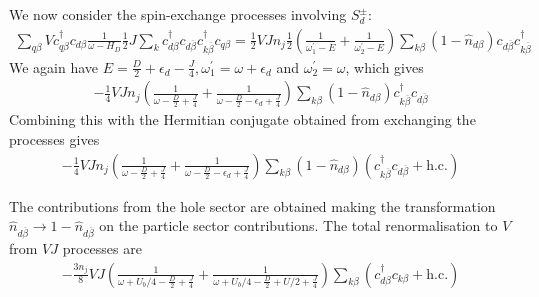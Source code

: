 \documentclass[reprint,superscriptaddress,floatfix]{revtex4-2}
\begin{document}
\begin{widetext}
We now consider the spin-exchange processes involving \(S_d^\pm\):
\begin{equation}\begin{aligned}
	\sum_{q\beta} Vc^\dagger_{q\beta} c_{d\beta} \frac{1}{\omega - H_D}\frac{1}{2}J \sum_{k} c^\dagger_{d\beta}c_{d\overline\beta} c^\dagger_{k\overline\beta}c_{q\beta} = \frac{1}{2}V J n_j \frac{1}{2}\left(\frac{1}{\omega^\prime_1 - E} + \frac{1}{\omega^\prime_2 - E}\right) \sum_{k\beta} \left(1 - \hat n_{d\beta}\right) c_{d\overline\beta}c^\dagger_{k\overline\beta}
\end{aligned}\end{equation}
We again have \(E = \frac{D}{2} + \epsilon_d - \frac{J}{4},\omega_1^\prime = \omega + \epsilon_d\) and \(\omega_2^\prime = \omega\), which gives
\begin{equation}\begin{aligned}
	-\frac{1}{4}V J n_j \left(\frac{1}{\omega - \frac{D}{2} + \frac{J}{4}} + \frac{1}{\omega - \frac{D}{2} - \epsilon_d + \frac{J}{4}}\right) \sum_{k\beta} \left(1 - \hat n_{d\beta}\right)c^\dagger_{k\overline\beta} c_{d\overline\beta}
\end{aligned}\end{equation}
Combining this with the Hermitian conjugate obtained from exchanging the processes gives
\begin{equation}\begin{aligned}
	-\frac{1}{4}V J n_j \left(\frac{1}{\omega - \frac{D}{2} + \frac{J}{4}} + \frac{1}{\omega - \frac{D}{2} - \epsilon_d + \frac{J}{4}}\right) \sum_{k\beta} \left(1 - \hat n_{d\beta}\right)\left(c^\dagger_{k\overline\beta} c_{d\overline\beta} + \text{h.c.}\right)
\end{aligned}\end{equation}

The contributions from the hole sector are obtained making the transformation \(\hat n_{d\overline\beta} \to 1 - \hat n_{d\overline\beta}\) on the particle sector contributions. The total renormalisation to \(V\) from \(VJ\) processes are
\begin{equation}\begin{aligned}
	-\frac{3n_j}{8}V J \left(\frac{1}{\omega +U_b/4 - \frac{D}{2} + \frac{J}{4}} + \frac{1}{\omega +U_b/4 - \frac{D}{2} + U/2 + \frac{J}{4}}\right) \sum_{k\beta}\left(c^\dagger_{d\beta} c_{k\beta} + \text{h.c.}\right)
\end{aligned}\end{equation}


\end{widetext}
\end{document}
